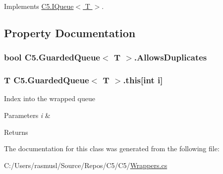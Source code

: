 Implements \hyperlink{interface_c5_1_1_i_queue_afceb820ca32b996f6fd5c34a85ccbacd}{C5.\+I\+Queue$<$ T $>$}.



\subsection{Property Documentation}
\hypertarget{class_c5_1_1_guarded_queue_a859d295a8e0e99348ddb273b88d33b15}{}
\subsubsection[{Allows\+Duplicates}]{\setlength{\rightskip}{0pt plus 5cm}bool {\bf C5.\+Guarded\+Queue}$<$ T $>$.Allows\+Duplicates\hspace{0.3cm}{\ttfamily [get]}}\label{class_c5_1_1_guarded_queue_a859d295a8e0e99348ddb273b88d33b15}




\hypertarget{class_c5_1_1_guarded_queue_a5c18da3f129993454969b145f1fce822}{}
\subsubsection[{this[int i]}]{\setlength{\rightskip}{0pt plus 5cm}T {\bf C5.\+Guarded\+Queue}$<$ T $>$.this\mbox{[}int i\mbox{]}\hspace{0.3cm}{\ttfamily [get]}}\label{class_c5_1_1_guarded_queue_a5c18da3f129993454969b145f1fce822}


Index into the wrapped queue 


\begin{DoxyParams}{Parameters}
{\em i} & \\
\hline
\end{DoxyParams}
\begin{DoxyReturn}{Returns}

\end{DoxyReturn}


The documentation for this class was generated from the following file\+:\begin{DoxyCompactItemize}
\item 
C\+:/\+Users/rasmusl/\+Source/\+Repos/\+C5/\+C5/\hyperlink{_wrappers_8cs}{Wrappers.\+cs}\end{DoxyCompactItemize}
